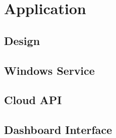\chapter{Application}
\label{chapter:application}


\section{Design}
\label{section:design}

\section{Windows Service}
\label{section:winService}

\section{Cloud API}
\label{section:cloudApi}

\section{Dashboard Interface}
\label{section:dashboard}